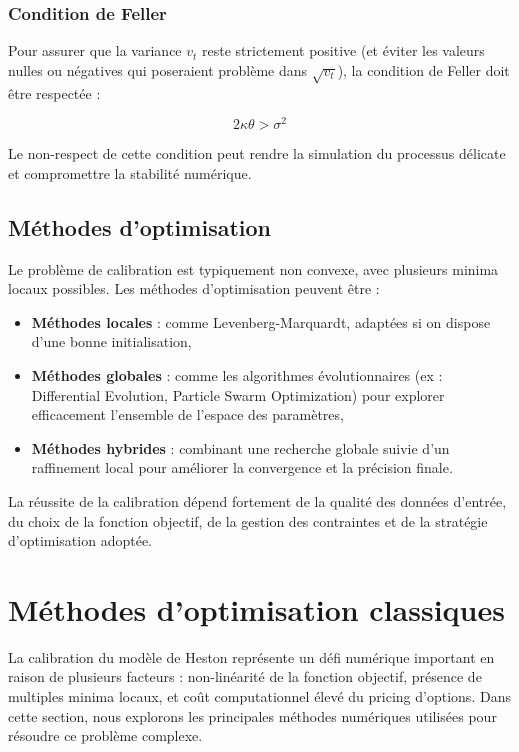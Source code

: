 \subsubsection{Condition de Feller}

Pour assurer que la variance $v_t$ reste strictement positive (et éviter les valeurs nulles ou négatives qui poseraient problème dans $\sqrt{v_t}$), la condition de Feller doit être respectée :

\begin{equation}
	2\kappa\theta > \sigma^2
\end{equation}

Le non-respect de cette condition peut rendre la simulation du processus délicate et compromettre la stabilité numérique.

\subsection{Méthodes d'optimisation}

Le problème de calibration est typiquement non convexe, avec plusieurs minima locaux possibles. Les méthodes d'optimisation peuvent être :

\begin{itemize}
	\item \textbf{Méthodes locales} : comme Levenberg-Marquardt, adaptées si on dispose d'une bonne initialisation,
	\item \textbf{Méthodes globales} : comme les algorithmes évolutionnaires (ex : Differential Evolution, Particle Swarm Optimization) pour explorer efficacement l'ensemble de l'espace des paramètres,
	\item \textbf{Méthodes hybrides} : combinant une recherche globale suivie d'un raffinement local pour améliorer la convergence et la précision finale.
\end{itemize}

La réussite de la calibration dépend fortement de la qualité des données d'entrée, du choix de la fonction objectif, de la gestion des contraintes et de la stratégie d'optimisation adoptée.

\section{Méthodes d'optimisation classiques}

La calibration du modèle de Heston représente un défi numérique important en raison de plusieurs facteurs : non-linéarité de la fonction objectif, présence de multiples minima locaux, et coût computationnel élevé du pricing d'options. Dans cette section, nous explorons les principales méthodes numériques utilisées pour résoudre ce problème complexe.

